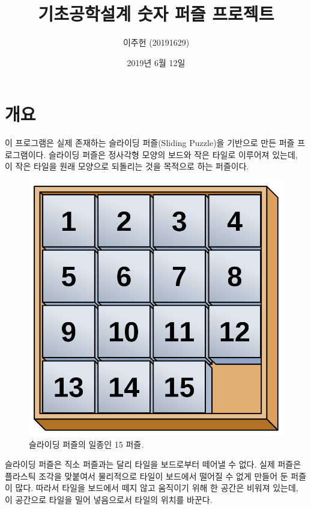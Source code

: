 \documentclass{article}
\title{기초공학설계 숫자 퍼즐 프로젝트}
\author{이주헌 (20191629)}
\date{2019년 6월 12일}
\begin{document}
\maketitle
\newpage


\section{개요}

이 프로그램은 실제 존재하는 슬라이딩 퍼즐(Sliding Puzzle)을 기반으로 만든 퍼즐 프로그램이다. 슬라이딩 퍼즐은 정사각형 모양의 보드와 작은 타일로 이루어져 있는데, 이 작은 타일을 원래 모양으로 되돌리는 것을 목적으로 하는 퍼즐이다.

\begin{figure}[ht!]
  \includegraphics[width=\linewidth]{res/15-puzzle.png}
  \caption{슬라이딩 퍼즐의 일종인 15 퍼즐.}
  \label{fig:15-puzzle}
\end{figure}

슬라이딩 퍼즐은 직소 퍼즐과는 달리 타일을 보드로부터 떼어낼 수 없다. 실제 퍼즐은 플라스틱 조각을 맞붙여서 물리적으로 타일이 보드에서 떨어질 수 없게 만들어 둔 퍼즐이 많다. 따라서 타일을 보드에서 떼지 않고 움직이기 위해 한 공간은 비워져 있는데, 이 공간으로 타일을 밀어 넣음으로서 타일의 위치를 바꾼다.
\end{document}
